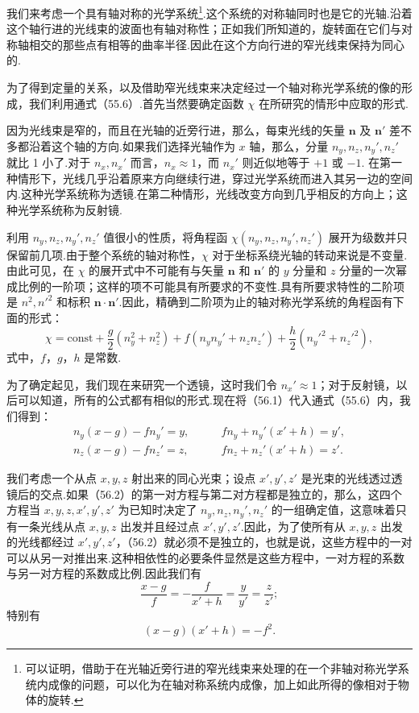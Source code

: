 我们来考虑一个具有轴对称的光学系统\footnote{可以证明，借助于在光轴近旁行进的窄光线束来处理的在一个非轴对称光学系统内成像的问题，可以化为在轴对称系统内成像，加上如此所得的像相对于物体的旋转.}.这个系统的对称轴同时也是它的光轴.沿着这个轴行进的光线束的波面也有轴对称性；正如我们所知道的，旋转面在它们与对称轴相交的那些点有相等的曲率半径.因此在这个方向行进的窄光线束保持为同心的.

为了得到定量的关系，以及借助窄光线束来决定经过一个轴对称光学系统的像的形成，我们利用通式（55.6）.首先当然要确定函数 $\chi$ 在所研究的情形中应取的形式.

因为光线束是窄的，而且在光轴的近旁行进，那么，每束光线的矢量 $\boldsymbol{n}$ 及 $\boldsymbol{n}'$ 差不多都沿着这个轴的方向.如果我们选择光轴作为 $x$ 轴，那么，分量 $n_y,n_z,n_y',n_z'$ 就比 1 小了.对于 $n_x,n_x'$ 而言，$n_x\approx 1$，而 $n_x'$ 则近似地等于 $+1$ 或 $-1$. 在第一种情形下，光线几乎沿着原来方向继续行进，穿过光学系统而进入其另一边的空间内.这种光学系统称为透镜.在第二种情形，光线改变方向到几乎相反的方向上；这种光学系统称为反射镜.

利用 $n_y,n_z,n_y',n_z'$ 值很小的性质，将角程函 $\chi(n_y,n_z,n_y',n_z')$ 展开为级数并只保留前几项.由于整个系统的轴对称性，$\chi$ 对于坐标系绕光轴的转动来说是不变量.由此可见，在 $\chi$ 的展开式中不可能有与矢量 $\boldsymbol{n}$ 和 $\boldsymbol{n}'$ 的 $y$ 分量和 $z$ 分量的一次幂成比例的一阶项；这样的项不可能具有所要求的不变性.具有所要求特性的二阶项是 $n^2,n'^2$ 和标积 $\boldsymbol{n}\cdot\boldsymbol{n}'$.因此，精确到二阶项为止的轴对称光学系统的角程函有下面的形式：
\begin{equation}
  \chi=\mathrm{const}+\frac{g}{2}(n_y^2+n_z^2)
  +f(n_yn_y'+n_zn_z')
  +\frac{h}{2}(n_y'^2+n_z'^2),
\end{equation}
式中，$f$，$g$，$h$ 是常数.

为了确定起见，我们现在来研究一个透镜，这时我们令 $n_x'\approx 1$；对于反射镜，以后可以知道，所有的公式都有相似的形式.现在将（56.1）代入通式（55.6）内，我们得到：
\begin{equation}
\begin{aligned}
  n_y(x-g)-fn_y'=y, &\qquad fn_y+n_y'(x'+h)=y',\\
  n_z(x-g)-fn_z'=z, &\qquad fn_z+n_z'(x'+h)=z'.
\end{aligned}
\end{equation}

我们考虑一个从点 $x,y,z$ 射出来的同心光束；设点 $x',y',z'$ 是光束的光线透过透镜后的交点.如果（56.2）的第一对方程与第二对方程都是独立的，那么，这四个方程当 $x,y,z,x',y',z'$ 为已知时决定了 $n_y,n_z,n_y',n_z'$ 的一组确定值，这意味着只有一条光线从点 $x,y,z$ 出发并且经过点 $x',y',z'$.因此，为了使所有从 $x,y,z$ 出发的光线都经过 $x',y',z'$，（56.2）就必须不是独立的，也就是说，这些方程中的一对可以从另一对推出来.这种相依性的必要条件显然是这些方程中，一对方程的系数与另一对方程的系数成比例.因此我们有
\begin{equation}
  \frac{x-g}{f}=-\frac{f}{x'+h}=\frac{y}{y'}=\frac{z}{z'};
\end{equation}
特别有
\begin{equation}
  (x-g)(x'+h)=-f^2.
\end{equation}

